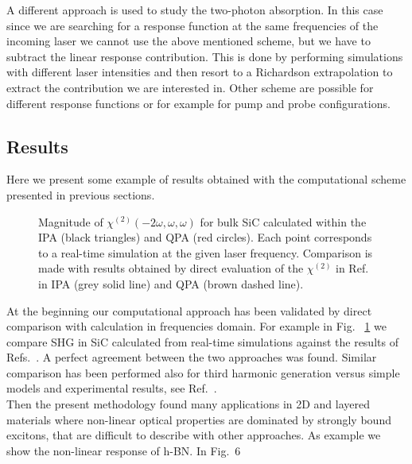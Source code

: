 A different approach is used to study the two-photon absorption. In this case since we are searching for a response function at the same frequencies of the incoming laser we cannot use the above mentioned scheme, but we have to subtract the linear response contribution. This is done by performing simulations with different laser intensities and then  resort to a Richardson extrapolation to extract the contribution we are interested in.\cite{attaccalite2018two} Other scheme are possible for different response functions or for example for pump and probe configurations.
\subsection{Results}\label{sc:results}

%                                                                                                                     
Here we present some example of results obtained with the computational scheme presented in previous sections.
\begin{figure}
\centering
{}
\caption{\footnotesize{Magnitude of $\chi^{(2)}(-2\omega,\omega,\omega)$ for bulk SiC calculated within the IPA (black triangles) and QPA (red circles). Each point corresponds to a real-time simulation at the given laser frequency. Comparison is made with results obtained \ai by direct evaluation of the $\chi^{(2)}$ in Ref.~\cite{PhysRevB.82.235201} in IPA (grey solid line) and QPA (brown dashed line).  \label{fg:SiCQPRPA} }}
\end{figure}
At the beginning our computational approach has been validated by direct comparison with calculation in frequencies domain. For example in Fig. ~\ref{fg:SiCQPRPA} we compare SHG in SiC calculated from real-time simulations against the results of Refs.~\cite{PhysRevB.82.235201,PSSB.427.1984}. A perfect agreement between the two approaches was found. Similar comparison has been performed also for third harmonic generation versus simple models and experimental results, see Ref.~.\\
Then the present  methodology found many applications in 2D and layered materials\cite{attaccalite2015strong,wei2019second,beach2020strain,mishra2020exciton,attaccalite2019second} where non-linear optical properties are dominated by strongly bound excitons, that are difficult to describe with other approaches. As example we show the non-linear response of h-BN. In Fig.~6
